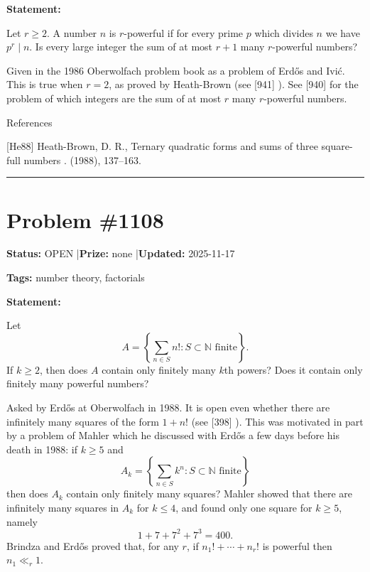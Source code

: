 \documentclass{article}
\begin{document}
\medskip

\noindent\textbf{Statement:}

Let $r\geq 2$. A number $n$ is $r$-powerful if for every prime $p$ which divides $n$ we have $p^r\mid n$. Is every large integer the sum of at most $r+1$ many $r$-powerful numbers?




Given in the 1986 Oberwolfach problem book as a problem of Erd\H{o}s and Ivi\'{c}. This is true when $r=2$, as proved by Heath-Brown \cite{He88} (see [941] ). See [940] for the problem of which integers are the sum of at most $r$ many $r$-powerful numbers.




References

[He88] Heath-Brown, D. R., Ternary quadratic forms and sums of three square-full numbers . (1988), 137--163.

\noindent\rule{\linewidth}{0.4pt}


\section{Problem \#1108}
\label{prob:1108}

\noindent\textbf{Status:} OPEN \quad|\quad \textbf{Prize:} none \quad|\quad \textbf{Updated:} 2025-11-17

\noindent\textbf{Tags:} number theory, factorials

\medskip

\noindent\textbf{Statement:}

Let\[A = \left\{ \sum_{n\in S}n! : S\subset \mathbb{N}\textrm{ finite}\right\}.\]If $k\geq 2$, then does $A$ contain only finitely many $k$th powers? Does it contain only finitely many powerful numbers?




Asked by Erd\H{o}s at Oberwolfach in 1988. It is open even whether there are infinitely many squares of the form $1+n!$ (see [398] ). This was motivated in part by a problem of Mahler which he discussed with Erd\H{o}s a few days before his death in 1988: if $k\geq 5$ and\[A_k= \left\{ \sum_{n\in S}k^n : S\subset \mathbb{N}\textrm{ finite}\right\}\]then does $A_k$ contain only finitely many squares? Mahler showed that there are infinitely many squares in $A_k$ for $k\leq 4$, and found only one square for $k\geq 5$, namely\[1+7+7^2+7^3=400.\]Brindza and Erd\H{o}s \cite{BrEr91} proved that, for any $r$, if $n_1!+\cdots+n_r!$ is powerful then $n_1\ll_r 1$.
\end{document}
